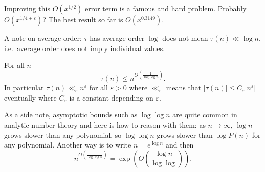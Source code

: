 \documentclass[a4paper]{article}
\theoremstyle{definition}
\begin{document}
\begin{remark}
  Improving this \(O(x^{1/2})\) error term is a famous and hard problem. Probably \(O(x^{1/4 + \varepsilon})\)? The best result so far is \(O(x^{0.3149})\).
\end{remark}

A note on average order: \(\tau\) has average order \(\log\) does not mean \(\tau(n) \ll \log n\), i.e.\ average order does not imply individual values.

\begin{theorem}
  For all \(n\)
  \[
    \tau(n) \leq n^{O(\frac{1}{\log \log n})}.
  \]
  In particular \(\tau(n) \ll_\varepsilon n^\varepsilon\) for all \(\varepsilon > 0\) where \(\ll_\varepsilon\) means that \(|\tau(n)| \leq C_\varepsilon |n^\varepsilon|\) eventually where \(C_\varepsilon\) is a constant depending on \(\varepsilon\).
\end{theorem}

As a side note, asymptotic bounds such as \(\log \log n\) are quite common in analytic number theory and here is how to reason with them: as \(n \to \infty\), \(\log n\) grows slower than any polynomial, so \(\log \log n\) grows slower than \(\log P(n)\) for any polynomial. Another way is to write \(n = e^{\log n}\) and then
\[
  n^{O(\frac{1}{\log \log n})} = \exp (O(\frac{\log n}{\log \log})).
\]
\end{document}
